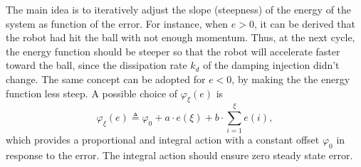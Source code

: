 %
The main idea is to iteratively adjust the slope (steepness) of the energy of the system as function of the error. For instance, when $e>0$, it can be derived that the robot had hit the ball with not enough momentum. Thus, at the next cycle, the energy function should be steeper so that the robot will accelerate faster toward the ball, since the dissipation rate $k_d$ of the damping injection didn't change. The same concept can be adopted for $e<0$, by making the the energy function less steep.
%
A possible choice of $\varphi_\xi(e)$ is
%
\begin{equation}
    \varphi_\xi(e)  \triangleq \varphi_0 + a\cdot e(\xi) + b\cdot\sum_{i = 1}^{\xi}e(i),
\end{equation}
%
which provides a proportional and integral action with a constant offset $\varphi_0$ in response to the error. The integral action should ensure zero steady state error.
%
